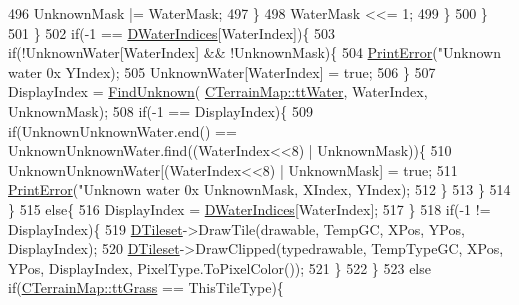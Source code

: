 \begin{DoxyCode}
{{496                                     UnknownMask |= WaterMask;
497                                 \}
498                                 WaterMask <<= 1;
499                             \}
500                         \}
501                     \}
502                     \textcolor{keywordflow}{if}(-1 == \hyperlink{classCMapRenderer_af82295ac61f841481490da6f2b433db2}{DWaterIndices}[WaterIndex])\{
503                         \textcolor{keywordflow}{if}(!UnknownWater[WaterIndex] && !UnknownMask)\{
504                             \hyperlink{Debug_8h_a2ed825eefefe35baf59a93a8c641323d}{PrintError}(\textcolor{stringliteral}{"Unknown water 0x%
      YIndex);   
505                             UnknownWater[WaterIndex] = \textcolor{keyword}{true};
506                         \}
507                         DisplayIndex = \hyperlink{classCMapRenderer_aec3c1d3294ac3af8ebb717ed5be88870}{FindUnknown}(
      \hyperlink{classCTerrainMap_aff2ab991e237269941416dd79d8871d4ab7c7a2abbef411fd768a4f209e307de5}{CTerrainMap::ttWater}, WaterIndex, UnknownMask);
508                         \textcolor{keywordflow}{if}(-1 == DisplayIndex)\{
509                             \textcolor{keywordflow}{if}(UnknownUnknownWater.end() == UnknownUnknownWater.find((WaterIndex<<8) | 
      UnknownMask))\{
510                                 UnknownUnknownWater[(WaterIndex<<8) | UnknownMask] = \textcolor{keyword}{true};
511                                 \hyperlink{Debug_8h_a2ed825eefefe35baf59a93a8c641323d}{PrintError}(\textcolor{stringliteral}{"Unknown water 0x%
      UnknownMask, XIndex, YIndex);   
512                             \}
513                         \}
514                     \}
515                     \textcolor{keywordflow}{else}\{
516                         DisplayIndex = \hyperlink{classCMapRenderer_af82295ac61f841481490da6f2b433db2}{DWaterIndices}[WaterIndex];  
517                     \}
518                     \textcolor{keywordflow}{if}(-1 != DisplayIndex)\{
519                         \hyperlink{classCMapRenderer_ace0648cba050b5e02431096edd15b836}{DTileset}->DrawTile(drawable, TempGC, XPos, YPos, DisplayIndex);
520                         \hyperlink{classCMapRenderer_ace0648cba050b5e02431096edd15b836}{DTileset}->DrawClipped(typedrawable, TempTypeGC, XPos, YPos, DisplayIndex, 
      PixelType.ToPixelColor());
521                     \}
522                 \}
523                 \textcolor{keywordflow}{else} \textcolor{keywordflow}{if}(\hyperlink{classCTerrainMap_aff2ab991e237269941416dd79d8871d4ae587716ed26a437b6ea33f0ac823d47a}{CTerrainMap::ttGrass} == ThisTileType)\{
}}}}
\end{DoxyCode}
